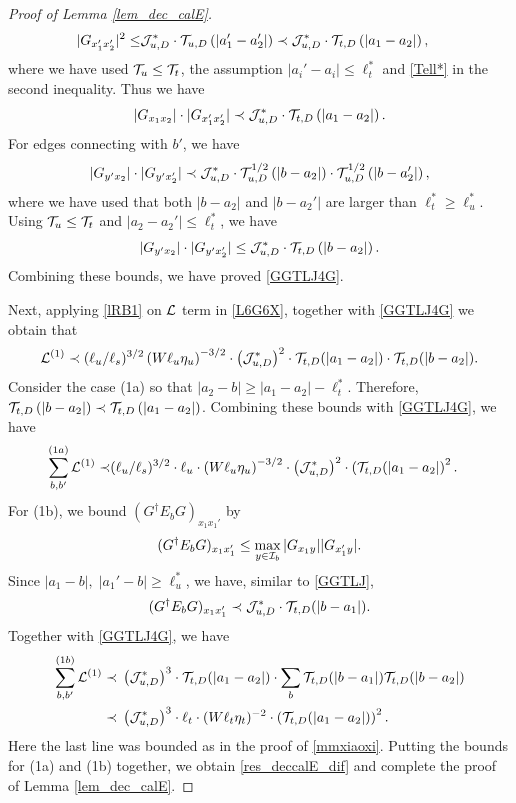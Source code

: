 \documentclass[10pt,reqno]{article}
\theoremstyle{plain} %
\theoremstyle{remark}
\numberwithin{equation}{section}
\begin{document}
\begin{proof}[Proof of Lemma \ref{lem_dec_calE}]
\begin{align}
 |G_{x_1'x_2'}|^2\le & {\cal J}^*_{u,D}\cdot {\cal T}_{u,D}\left( |a_1'-a_2'|\right)  \prec {\cal J}^*_{u,D}\cdot {\cal T}_{t,D}\left( |a_1-a_2|\right), 
\end{align} 
where  we have used ${\cal T}_u\le {\cal T}_t$, the assumption $|a_i'-a_i|\le \ell_t^*$ and \eqref{Tell*} in the   second inequality.  Thus we have 
$$
|G_{x_1x_2}|\cdot |G_{x_1'x_2'}|\prec   {\cal J}^*_{u,D}\cdot {\cal T}_{t,D}\left( |a_1-a_2|\right).
$$ 
For edges connecting with $b'$, we have 
$$
|G_{y'x_2}|\cdot |G_{y'x_2'}| \prec 
{\cal J}^*_{u,D}\cdot  {\cal T}^{1/2}_{u,D}\left( |b-a_2| \right)\cdot   {\cal T}^{1/2}_{u,D}\left(  |b-a_2'| \right),
$$
where we have used that  both  $|b-a_2|$ and $|b-a_2'|$ are larger than $\ell_t^*\ge \ell_u^*$.
Using  ${\cal T}_u\le {\cal T}_t$ and $|a_2-a_2'|\le \ell_t^*$, we have 
$$
|G_{y'x_2}|\cdot |G_{y'x_2'}|\le {\cal J}^*_{u,D}\cdot  {\cal T} _{t,D}\left(  |b-a_2| \right).
$$
Combining  these  bounds, we have proved \eqref{GGTLJ4G}. 

Next, applying  \eqref{lRB1} on $\cal L$ term in \eqref{L6G6X}, together with \eqref{GGTLJ4G} we obtain that 
$$
{\cal L}^{(1)}\prec (\ell_u/\ell_s)^{3/2}\left(W\ell_u\eta_u\right)^{-3/2}\cdot \left({\cal J}^*_{u,D}\right)^2\cdot 
{\cal T} _{t,D}(|a_1-a_2|)\cdot {\cal T} _{t,D}( |b-a_2|)  . 
$$
Consider the case (1a) so that   $|a_2-b|\ge |a_1-a_2|-\ell_t^*$. Therefore, ${\cal T} _{t,D}\left(  |b-a_2| \right) \prec 
{\cal T} _{t,D}\left(  |a_1-a_2| \right)$. 
Combining  these bounds  with \eqref{GGTLJ4G}, we have 
\begin{align}
  \sum_{b,b'}^{(1a)} {\cal L}^{(1)}
 \prec &(\ell_u/\ell_s)^{3/2} \cdot \ell_u \cdot\left(W \ell_u \eta_u\right)^{-3/2}
\cdot\left({\cal J}^*_{u,D}\right)^2  \cdot \left({\cal T}_{t,D}(|a_1-a_2|\right) ^2.
\end{align}
For (1b), we bound  $(G^\dagger E_bG)_{x_1x_1'}$ by 
$$
(G^\dagger E_bG)_{x_1x_1'}\le \max_{y\in {\cal I}_b}|G_{x_1y}||G_{x'_1y}|.
$$
Since  $ |a_1-b|,\; |a_1'-b| \ge \ell_u^*$,    we have, similar to \eqref{GGTLJ}, 
$$
(G^\dagger E_bG)_{x_1x_1'}
\prec {\cal J}^*_{u,D} \cdot  {\cal T}_{t,D}(|b-a_1|) .
$$
Together  with \eqref{GGTLJ4G}, we have  
\begin{align}
  \sum_{b,b'}^{(1b)} {\cal L}^{(1)}
 \prec\; & \left( {\cal J}^*_{u,D}\right)^3 \cdot  {\cal T}_{t,D}(|a_1-a_2|)\cdot \sum_b {\cal T}_{t,D}(|b-a_1|) {\cal T}_{t,D}(|b-a_2|)
 \nonumber \\
\prec \; &  \left( {\cal J}^*_{u,D}\right)^3 \cdot \ell_t \cdot (W\ell_t\eta_t)^{-2} 
\cdot \left({\cal T}_{t,D}(|a_1-a_2|)\right)^{2}.
 \end{align}
Here the last line was bounded as in the proof of \eqref{mmxiaoxi}.  Putting  the bounds for (1a) and (1b) together, we obtain \eqref{res_deccalE_dif} and complete the proof of Lemma  \ref{lem_dec_calE}. 
\end{proof}
\end{document}
